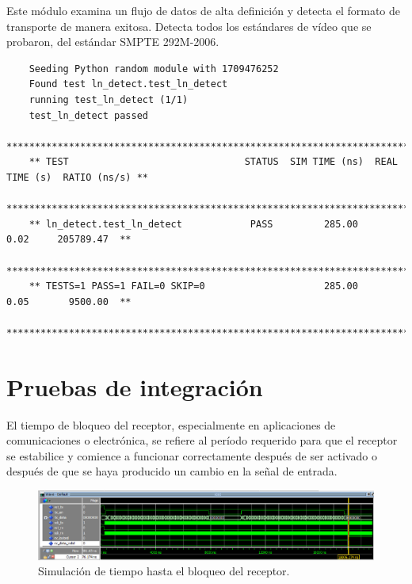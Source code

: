   Este módulo examina un flujo de datos de alta definición y detecta el formato
  de transporte de manera exitosa. Detecta todos los estándares de vídeo que se
  probaron, del estándar SMPTE 292M-2006\@.

  {\scriptsize\begin{verbatim}
    Seeding Python random module with 1709476252
    Found test ln_detect.test_ln_detect
    running test_ln_detect (1/1)
    test_ln_detect passed
    *******************************************************************************************
    ** TEST                               STATUS  SIM TIME (ns)  REAL TIME (s)  RATIO (ns/s) **
    *******************************************************************************************
    ** ln_detect.test_ln_detect            PASS         285.00           0.02     205789.47  **
    *******************************************************************************************
    ** TESTS=1 PASS=1 FAIL=0 SKIP=0                     285.00           0.05       9500.00  **
    *******************************************************************************************
  \end{verbatim}}

\section{Pruebas de integración}


  El tiempo de bloqueo del receptor, especialmente en aplicaciones de
  comunicaciones o electrónica, se refiere al período requerido para que el
  receptor se estabilice y comience a funcionar correctamente después de ser
  activado o después de que se haya producido un cambio en la señal de entrada.

  \begin{figure}[h]
    \centering
    \includegraphics[width=1\textwidth]{./Figures/rx_lock_time.png}
    \caption{Simulación de tiempo hasta el bloqueo del receptor.}\label{fig:lock}
  \end{figure}

